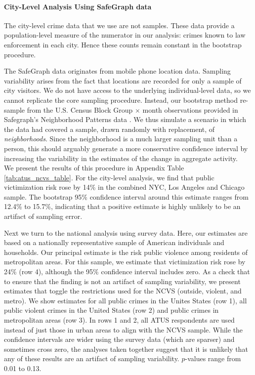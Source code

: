 \paragraph{City-Level Analysis Using SafeGraph data} The city-level crime data that we use \citep{nyc_crime_data, chicago_crime_data, la_crime_data} are not samples. These data provide a population-level measure of the numerator in our analysis: crimes known to law enforcement in each city. Hence these counts remain constant in the bootstrap procedure.

The SafeGraph data originates from mobile phone location data. Sampling variability arises from the fact that locations are recorded for only a sample of city visitors. We do not have access to the underlying individual-level data, so we cannot replicate the core sampling procedure. Instead, our bootstrap method re-sample from the U.S. Census Block Group $\times$ month observations provided in Safegraph's Neighborhood Patterns data \citep{sg_neighb}.  We thus simulate a scenario in which the data had covered a sample, drawn randomly with replacement, of \textit{neighborhoods}. Since the neighborhood is a much larger sampling unit than a person, this should arguably generate a more conservative confidence interval by increasing the variability in the estimates of the change in aggregate activity. \\

We present the results of this procedure in Appendix Table \ref{tab:atus_ncvs_table}. For the city-level analysis, we find that public victimization risk rose by 14\% in the combined NYC, Los Angeles and Chicago sample. The bootstrap 95\% confidence interval around this estimate ranges from 12.4\% to 15.7\%, indicating that a positive estimate is highly unlikely to be an artifact of sampling error. 

Next we turn to the national analysis using survey data. Here, our estimates are based on a nationally representative sample of American individuals and households. Our principal estimate is the risk public violence among residents of metropolitan areas. For this sample, we estimate that victimization risk rose by 24\% (row 4), although the 95\% confidence interval includes zero. As a check that to ensure that the finding is not an artifact of sampling variability, we  present estimates that toggle the restrictions used for the NCVS (outside, violent, and metro). We show estimates for all public crimes in the Unites States (row 1), all public violent crimes in the United States (row 2) and public crimes in metropolitan areas (row 3). In rows 1 and 2, all ATUS respondents are used instead of just those in urban areas to align with the NCVS sample. While the confidence intervals are wider using the survey data (which are sparser) and sometimes cross zero, the analyses taken together suggest that it is unlikely that any of these results are an artifact of sampling variability. $p$-values range from 0.01 to 0.13.



